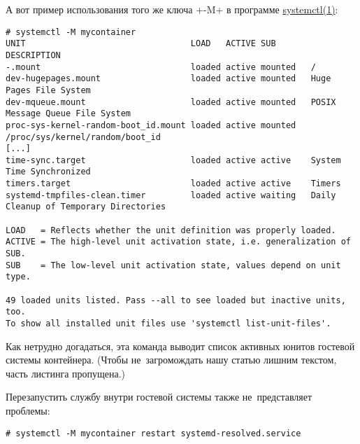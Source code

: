 \documentclass[10pt,oneside,a4paper]{article}
\begin{document}
А вот пример использования того же ключа +-M+ в программе
\href{http://www.freedesktop.org/software/systemd/man/systemctl.html}{systemctl(1)}:
\begin{Verbatim}[fontsize=\small]
# systemctl -M mycontainer
UNIT                                 LOAD   ACTIVE SUB       DESCRIPTION
-.mount                              loaded active mounted   /
dev-hugepages.mount                  loaded active mounted   Huge Pages File System
dev-mqueue.mount                     loaded active mounted   POSIX Message Queue File System
proc-sys-kernel-random-boot_id.mount loaded active mounted   /proc/sys/kernel/random/boot_id
[...]
time-sync.target                     loaded active active    System Time Synchronized
timers.target                        loaded active active    Timers
systemd-tmpfiles-clean.timer         loaded active waiting   Daily Cleanup of Temporary Directories

LOAD   = Reflects whether the unit definition was properly loaded.
ACTIVE = The high-level unit activation state, i.e. generalization of SUB.
SUB    = The low-level unit activation state, values depend on unit type.

49 loaded units listed. Pass --all to see loaded but inactive units, too.
To show all installed unit files use 'systemctl list-unit-files'.
\end{Verbatim}
Как нетрудно догадаться, эта команда выводит список активных юнитов гостевой
системы контейнера. (Чтобы не~загромождать нашу статью лишним текстом, часть
листинга пропущена.)

Перезапустить службу внутри гостевой системы также не~представляет проблемы:
\begin{Verbatim}
# systemctl -M mycontainer restart systemd-resolved.service
\end{Verbatim}
\end{document}
